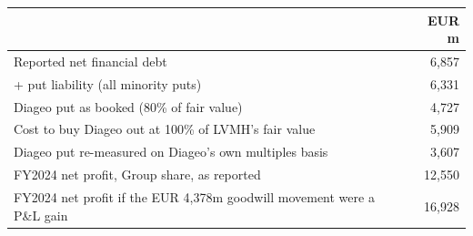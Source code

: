 \begin{tabular}{lr}
\toprule
 & EUR m \\
\midrule
Reported net financial debt & 6,857 \\
+ put liability (all minority puts) & 6,331 \\
Diageo put as booked (80\% of fair value) & 4,727 \\
Cost to buy Diageo out at 100\% of LVMH's fair value & 5,909 \\
Diageo put re-measured on Diageo's own multiples basis & 3,607 \\
FY2024 net profit, Group share, as reported & 12,550 \\
FY2024 net profit if the EUR 4,378m goodwill movement were a P\&L gain & 16,928 \\
\bottomrule
\end{tabular}
